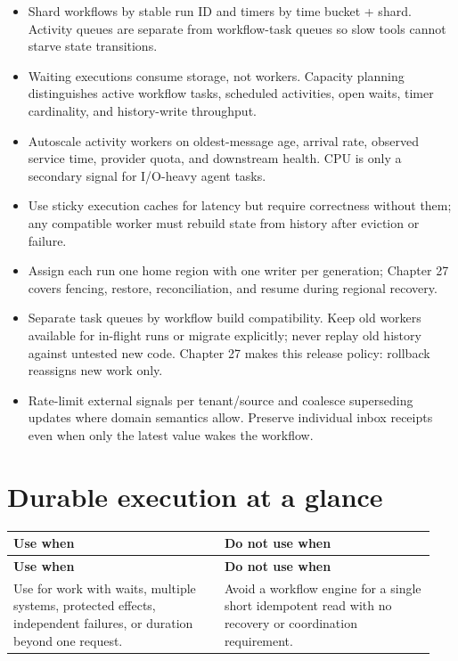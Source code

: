 \begin{itemize}

\item Shard workflows by stable run ID and timers by time bucket + shard. Activity queues are separate from workflow-task queues so slow tools cannot starve state transitions.

\item Waiting executions consume storage, not workers. Capacity planning distinguishes active workflow tasks, scheduled activities, open waits, timer cardinality, and history-write throughput.

\item Autoscale activity workers on oldest-message age, arrival rate, observed service time, provider quota, and downstream health. CPU is only a secondary signal for I/O-heavy agent tasks.

\item Use sticky execution caches for latency but require correctness without them; any compatible worker must rebuild state from history after eviction or failure.

\item Assign each run one home region with one writer per generation; Chapter 27 covers fencing, restore, reconciliation, and resume during regional recovery.

\item Separate task queues by workflow build compatibility. Keep old workers available for in-flight runs or migrate explicitly; never replay old history against untested new code. Chapter 27 makes this release policy: rollback reassigns new work only.

\item Rate-limit external signals per tenant/source and coalesce superseding updates where domain semantics allow. Preserve individual inbox receipts even when only the latest value wakes the workflow.

\end{itemize}

\section{Durable execution at a glance}

\BookTableStart
\small
\begin{longtable}{@{}Y{0.4700\linewidth}Y{0.4700\linewidth}@{}}
\color{white}\bfseries \textbf{Use when} & \color{white}\bfseries \textbf{Do not use when} \\
\endfirsthead
{}
\color{white}\bfseries \textbf{Use when} & \color{white}\bfseries \textbf{Do not use when} \\
\endhead
Use for work with waits, multiple systems, protected effects, independent failures, or duration beyond one request. & Avoid a workflow engine for a single short idempotent read with no recovery or coordination requirement. \\
\end{longtable}
\BookTableEnd

